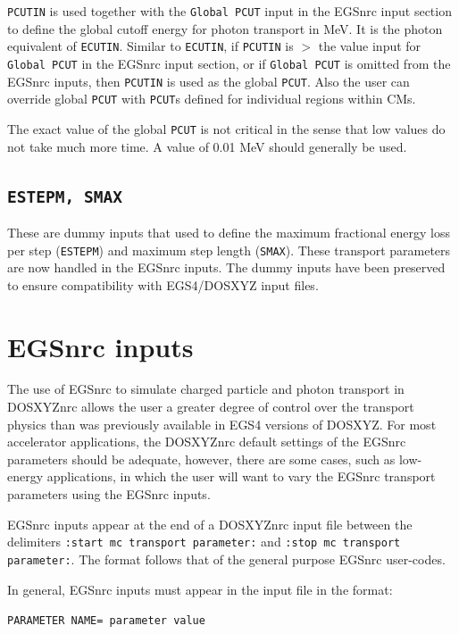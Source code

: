 \documentclass[12pt,twoside]{article}      %
\newcommand{\indexm}[1]{\index{#1}}
\begin{document}
\verb+PCUTIN+ is used together with the {\tt Global PCUT} input in the EGSnrc
input section to define the global cutoff energy for photon transport in
MeV.  It is the photon equivalent of \verb+ECUTIN+.  Similar to {\tt ECUTIN},
if {\tt PCUTIN} is $>$ the value input for {\tt Global PCUT} in the EGSnrc
input section, or if {\tt Global PCUT} is omitted from the EGSnrc inputs, then
{\tt PCUTIN} is used as the global {\tt PCUT}.  Also
the user can override global \verb+PCUT+ with \verb+PCUT+s defined for
individual regions within CMs.

The exact value of the global \verb+PCUT+ is not critical in the sense that low
values do not take much more time. A value of 0.01 MeV
should generally be used.

\subsection{{\tt ESTEPM, SMAX}}
\indexm{ESTEPM}
\indexm{SMAX}

These are dummy inputs that used to define the
maximum fractional energy loss per step ({\tt ESTEPM}) and maximum
step length ({\tt SMAX}).  These transport parameters are now handled in the
EGSnrc inputs.  The dummy inputs have been preserved to ensure compatibility
with EGS4/DOSXYZ input files.

\section{EGSnrc inputs}
\label{egsnrc_inputs}

The use of EGSnrc to simulate charged particle and photon transport
in DOSXYZnrc allows the user a greater degree of control over the
transport physics
than was previously available in EGS4 versions of DOSXYZ.  For most
accelerator applications, the DOSXYZnrc default settings of the EGSnrc
parameters should be adequate, however, there are some cases, such
as low-energy applications, in which the user will want to vary
the EGSnrc transport parameters using the EGSnrc inputs.

EGSnrc inputs appear at the end of a DOSXYZnrc input file between the
delimiters {\tt :start mc transport parameter:} and
{\tt :stop mc transport parameter:}.  The format follows that of the
general purpose EGSnrc user-codes\cite{Ro00}.


In general, EGSnrc inputs must appear in the input file in
the format:

{\tt PARAMETER NAME= parameter value}
\end{document}
